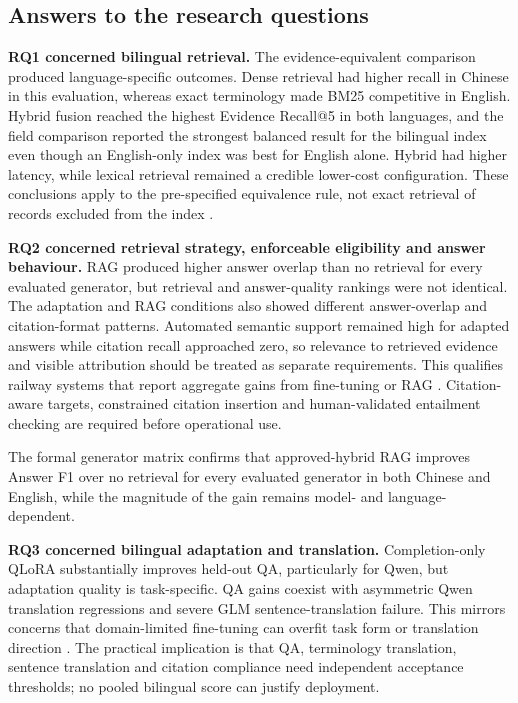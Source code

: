 \subsection{Answers to the research questions}

\textbf{RQ1 concerned bilingual retrieval.} The evidence-equivalent comparison produced language-specific outcomes. Dense retrieval had higher recall in Chinese in this evaluation, whereas exact terminology made BM25 competitive in English. Hybrid fusion reached the highest Evidence Recall@5 in both languages, and the field comparison reported the strongest balanced result for the bilingual index even though an English-only index was best for English alone. Hybrid had higher latency, while lexical retrieval remained a credible lower-cost configuration. These conclusions apply to the pre-specified equivalence rule, not exact retrieval of records excluded from the index \citep{robertson2009bm25,cormack2009rrf}.

\textbf{RQ2 concerned retrieval strategy, enforceable eligibility and answer behaviour.} RAG produced higher answer overlap than no retrieval for every evaluated generator, but retrieval and answer-quality rankings were not identical. The adaptation and RAG conditions also showed different answer-overlap and citation-format patterns. Automated semantic support remained high for adapted answers while citation recall approached zero, so relevance to retrieved evidence and visible attribution should be treated as separate requirements. This qualifies railway systems that report aggregate gains from fine-tuning or RAG \citep{li2024rschat,li2025training,luo2025driver,huang2026emergency}. Citation-aware targets, constrained citation insertion and human-validated entailment checking are required before operational use.

The formal generator matrix confirms that approved-hybrid RAG improves Answer F1 over no retrieval for every evaluated generator in both Chinese and English, while the magnitude of the gain remains model- and language-dependent.

\textbf{RQ3 concerned bilingual adaptation and translation.} Completion-only QLoRA substantially improves held-out QA, particularly for Qwen, but adaptation quality is task-specific. QA gains coexist with asymmetric Qwen translation regressions and severe GLM sentence-translation failure. This mirrors concerns that domain-limited fine-tuning can overfit task form or translation direction \citep{hu2024translation,vieira2024translation}. The practical implication is that QA, terminology translation, sentence translation and citation compliance need independent acceptance thresholds; no pooled bilingual score can justify deployment.

